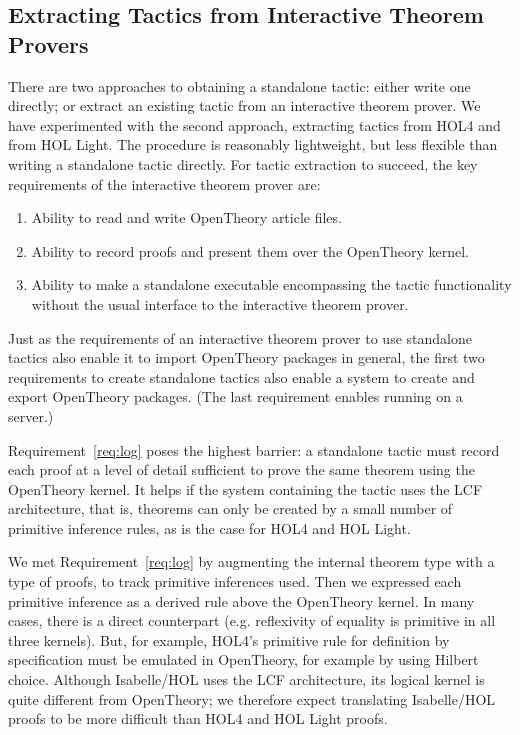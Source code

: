 \documentclass{llncs}
\newcommand{\OpenTheory}{OpenTheory\xspace}
\newcommand{\eg}{e.g.\xspace}
\begin{document}
\subsection{Extracting Tactics from Interactive Theorem Provers}

There are two approaches to obtaining a standalone tactic: either write one directly; or extract an existing tactic from an interactive theorem prover.
We have experimented with the second approach, extracting tactics from HOL4 and from HOL Light.
The procedure is reasonably lightweight, but less flexible than writing a standalone tactic directly.
For tactic extraction to succeed, the key requirements of the interactive theorem prover are:
\begin{enumerate}
\item\label{req:io} Ability to read and write \OpenTheory article files.

\item\label{req:log} Ability to record proofs and present them over the \OpenTheory kernel.

\item\label{req:ckpt} Ability to make a standalone executable encompassing the tactic functionality without the usual interface to the interactive theorem prover.
\end{enumerate}

Just as the requirements of an interactive theorem prover to use standalone tactics also enable it to import \OpenTheory packages in general, the first two requirements to create standalone tactics also enable a system to create and export \OpenTheory packages.
(The last requirement enables running on a server.)

Requirement~\ref{req:log} poses the highest barrier: a standalone tactic must record each proof at a level of detail sufficient to prove the same theorem using the \OpenTheory kernel.
It helps if the system containing the tactic uses the LCF architecture, that is, theorems can only be created by a small number of primitive inference rules, as is the case for HOL4 and HOL Light.

We met Requirement~\ref{req:log} by augmenting the internal theorem type with a type of proofs, to track primitive inferences used.
Then we expressed each primitive inference as a derived rule above the \OpenTheory kernel.
In many cases, there is a direct counterpart (\eg reflexivity of equality is primitive in all three kernels).
But, for example, HOL4's primitive rule for definition by specification must be emulated in \OpenTheory, for example by using Hilbert choice.
Although Isabelle/HOL uses the LCF architecture, its logical kernel is quite different from \OpenTheory; we therefore expect translating Isabelle/HOL proofs to be more difficult than HOL4 and HOL Light proofs.
\end{document}
